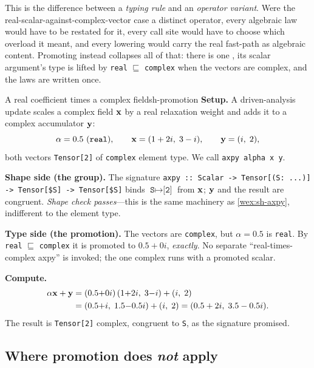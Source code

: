 This is the difference between a \emph{typing rule} and an \emph{operator
variant}. Were the real-scalar-against-complex-vector case a distinct
operator, every algebraic law would have to be restated for it, every call
site would have to choose which overload it meant, and every lowering would
carry the real fast-path as algebraic content. Promoting instead collapses all
of that: there is one , its scalar argument's type is lifted by
\texttt{real} $\sqsubseteq$ \texttt{complex} when the vectors are complex, and
the laws are written once.

\begin{workedexample}{A real coefficient times a complex field}{sh-promotion}
\textbf{Setup.} A driven-analysis update scales a complex field $\mathbf{x}$ by a
real relaxation weight and adds it to a complex accumulator $\mathbf{y}$:
\[
  \alpha = 0.5 \ (\texttt{real}), \qquad
  \mathbf{x} = (1+2i,\; 3-i), \qquad
  \mathbf{y} = (i,\; 2),
\]
both vectors \lstinline[style=l4style]|Tensor[2]| of \texttt{complex} element
type. We call \lstinline[style=l4style]|axpy alpha x y|.

\tcblower
\textbf{Shape side (the group).} The signature
\lstinline[style=l4style]|axpy :: Scalar -> Tensor[(S: ...)] -> Tensor[$S] -> Tensor[$S]|
binds $\texttt{S} \mapsto \texttt{[2]}$ from $\mathbf{x}$; $\mathbf{y}$ and the result are
congruent. \emph{Shape check passes}---this is the same machinery as
\cref{wex:sh-axpy}, indifferent to the element type.

\textbf{Type side (the promotion).} The vectors are \texttt{complex}, but
$\alpha = 0.5$ is \texttt{real}. By \texttt{real} $\sqsubseteq$ \texttt{complex}
it is promoted to $0.5 + 0i$, \emph{exactly}. No separate ``real-times-complex
axpy'' is invoked; the one complex  runs with a promoted scalar.

\textbf{Compute.}
\begin{align*}
  \alpha\mathbf{x} + \mathbf{y}
  &= (0.5{+}0i)\,(1{+}2i,\; 3{-}i) + (i,\; 2) \\
  &= (0.5{+}i,\; 1.5{-}0.5i) + (i,\; 2)
   = (0.5 + 2i,\; 3.5 - 0.5i).
\end{align*}
The result is \lstinline[style=l4style]|Tensor[2]| complex, congruent to
\texttt{S}, as the signature promised.
\end{workedexample}

\subsection{Where promotion does \emph{not} apply}
\label{sec:sh-promotion-limits}

